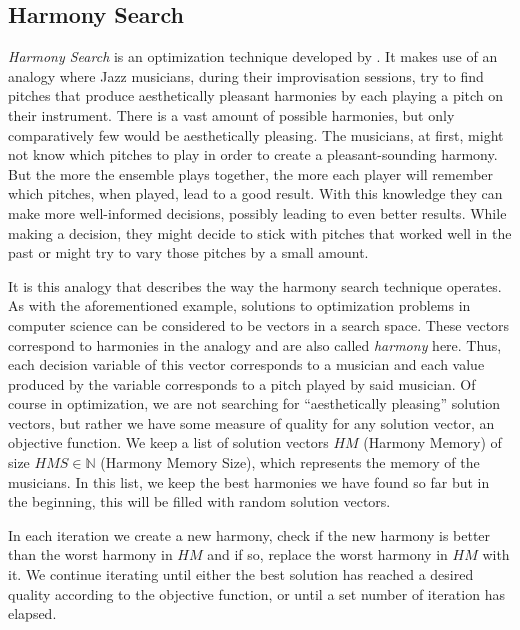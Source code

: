 \subsection{Harmony Search}
\label{subsec:04:hs}

\emph{Harmony Search} \cite{geem_optimal_2000,geem_state---art_2010} is an optimization technique developed by .
It makes use of an analogy where Jazz musicians, during their improvisation sessions, try to find pitches that produce aesthetically pleasant harmonies by each playing a pitch on their instrument. \cite{geem_introduction_2022}
There is a vast amount of possible harmonies, but only comparatively few would be aesthetically pleasing.
The musicians, at first, might not know which pitches to play in order to create a pleasant-sounding harmony.
But the more the ensemble plays together, the more each player will remember which pitches, when played, lead to a good result.
With this knowledge they can make more well-informed decisions, possibly leading to even better results.
While making a decision, they might decide to stick with pitches that worked well in the past or might try to vary those pitches by a small amount.

It is this analogy that describes the way the harmony search technique operates.
As with the aforementioned example, solutions to optimization problems in computer science can be considered to be vectors in a search space.
These vectors correspond to harmonies in the analogy and are also called \emph{harmony} here.
Thus, each decision variable of this vector corresponds to a musician and each value produced by the variable corresponds to a pitch played by said musician.
Of course in optimization, we are not searching for \enquote{aesthetically pleasing} solution vectors, but rather we have some measure of quality for any solution vector, an objective function.
We keep a list of solution vectors $HM$ (Harmony Memory) of size $HMS \in \mathbb{N}$ (Harmony Memory Size), which represents the memory of the musicians.
In this list, we keep the best harmonies we have found so far but in the beginning, this will be filled with random solution vectors.

In each iteration we create a new harmony, check if the new harmony is better than the worst harmony in $HM$ and if so, replace the worst harmony in $HM$ with it.
We continue iterating until either the best solution has reached a desired quality according to the objective function, or until a set number of iteration has elapsed.

